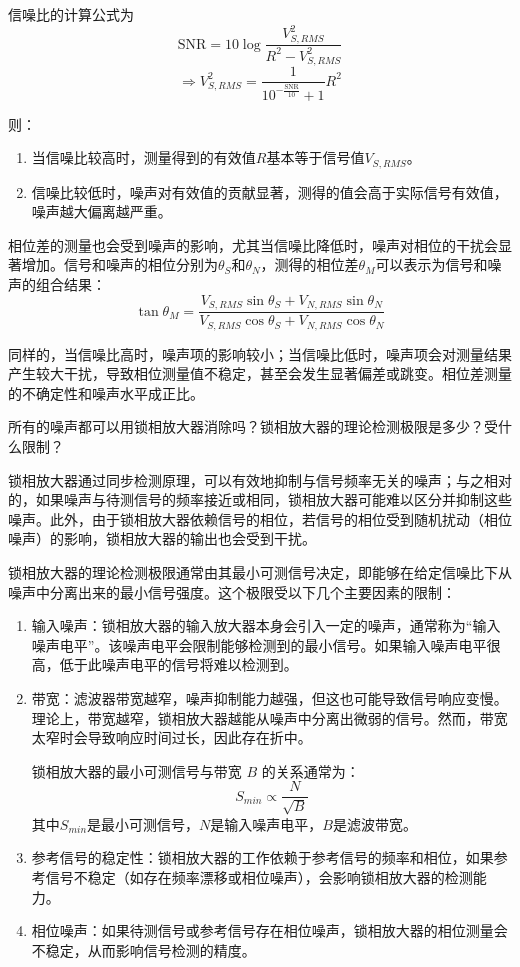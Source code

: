 \documentclass[dvipsnames, svgnames,a4paper,11pt]{article}
\begin{document}
	信噪比的计算公式为
	\[
		\mathrm{SNR} = 10\log\frac{V_{S,RMS}^2}{R^2 - V_{S,RMS}^2}
	\]
	\[
		\Rightarrow V_{S,RMS}^2 = \frac{1}{10^{-\frac{\mathrm{SNR}}{10}} + 1} R^2
	\]

	则：
	\begin{enumerate}
		\item 当信噪比较高时，测量得到的有效值$R$基本等于信号值$V_{S,RMS}$。
		\item 信噪比较低时，噪声对有效值的贡献显著，测得的值会高于实际信号有效值，噪声越大偏离越严重。
	\end{enumerate}

	相位差的测量也会受到噪声的影响，尤其当信噪比降低时，噪声对相位的干扰会显著增加。信号和噪声的相位分别为$\theta_{S}$和$\theta_{N}$，测得的相位差$\theta_{M}$可以表示为信号和噪声的组合结果：
	\[
		\tan \theta_{M} = \frac{V_{S,RMS}\sin\theta_{S} + V_{N,RMS}\sin\theta_{N}}{V_{S,RMS}\cos\theta_{S} + V_{N,RMS}\cos\theta_{N}}
	\]

	同样的，当信噪比高时，噪声项的影响较小；当信噪比低时，噪声项会对测量结果产生较大干扰，导致相位测量值不稳定，甚至会发生显著偏差或跳变。相位差测量的不确定性和噪声水平成正比。


\begin{question}
	所有的噪声都可以用锁相放大器消除吗？锁相放大器的理论检测极限是多少？受什么限制？
\end{question}

	锁相放大器通过同步检测原理，可以有效地抑制与信号频率无关的噪声；与之相对的，如果噪声与待测信号的频率接近或相同，锁相放大器可能难以区分并抑制这些噪声。此外，由于锁相放大器依赖信号的相位，若信号的相位受到随机扰动（相位噪声）的影响，锁相放大器的输出也会受到干扰。

	锁相放大器的理论检测极限通常由其最小可测信号决定，即能够在给定信噪比下从噪声中分离出来的最小信号强度。这个极限受以下几个主要因素的限制：
	\begin{enumerate}
		\item 输入噪声：锁相放大器的输入放大器本身会引入一定的噪声，通常称为“输入噪声电平”。该噪声电平会限制能够检测到的最小信号。如果输入噪声电平很高，低于此噪声电平的信号将难以检测到。
		\item 带宽：滤波器带宽越窄，噪声抑制能力越强，但这也可能导致信号响应变慢。理论上，带宽越窄，锁相放大器越能从噪声中分离出微弱的信号。然而，带宽太窄时会导致响应时间过长，因此存在折中。
		
		锁相放大器的最小可测信号与带宽 $B$ 的关系通常为：
		\[
			S_{min} \propto \frac{N}{\sqrt{B}}
		\]
		其中$S_{min}$是最小可测信号，$N$是输入噪声电平，$B$是滤波带宽。

		\item 参考信号的稳定性：锁相放大器的工作依赖于参考信号的频率和相位，如果参考信号不稳定（如存在频率漂移或相位噪声），会影响锁相放大器的检测能力。
		\item 相位噪声：如果待测信号或参考信号存在相位噪声，锁相放大器的相位测量会不稳定，从而影响信号检测的精度。
	\end{enumerate}
\end{document}
